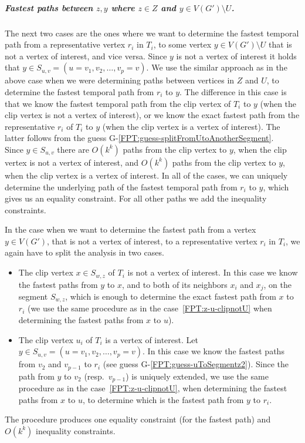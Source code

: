\documentclass[a4paper,UKenglish,cleveref, autoref, thm-restate]{lipics-v2021}
\begin{document}
\subparagraph{\boldmath Fastest paths between $z,y$ where $z \in Z$ and $y \in V(G') \setminus U$.}
The next two cases are the ones where we want to determine the fastest temporal path from a representative vertex $r_i$ in $T_i$, to some vertex $y \in V(G') \setminus U$ that is not a vertex of interest,
and vice versa.
Since $y$ is not a vertex of interest it holds that $y \in S_{u,v}=(u = v_1, v_2, \dots, v_p = v)$. %
We use the similar approach as in the above case when we were determining paths between vertices in $Z$ and $U$, 
to determine the fastest temporal path from $r_i$ to $y$. 
The difference in this case is that 
we know the fastest temporal path from the clip vertex of $T_i$ to $y$
(when the clip vertex is not a vertex of interest),
or we know the exact fastest path from the representative $r_i$ of $T_i$ to $y$
(when the clip vertex is a vertex of interest).
The latter follows from the guess G-\ref{FPT:guess-splitFromUtoAnotherSegment}.\\
%
Since $y \in S_{u,v}$ there are $O(k^{k})$ paths from the clip vertex to $y$, when the clip vertex is not a vertex of interest,
and $O(k^{k})$ paths from the clip vertex to $y$, when the clip vertex is a vertex of interest.
In all of the cases, we can uniquely determine the underlying path of the fastest temporal path from $r_i$ to $y$, which gives us an equality constraint.
For all other paths we add the inequality constraints. 

In the case when we want to determine the fastest path from a vertex $y \in V(G')$, that is not a vertex of interest,
to a representative vertex $r_i$ in $T_i$, 
we 
again have to split the analysis in two cases. 
\begin{itemize}
    \item The clip vertex $x \in S_{w,z}$ of $T_i$ is not a vertex of interest.
In this case we
know the fastest paths from $y$ to $x$, and to both of its neighbors $x_{i}$ and $x_{j}$, on the segment $S_{w,z}$,
which is enough to determine the exact fastest path from $x$ to $r_i$ 
(we use the same procedure as in the case~\ref{FPT:z-u-clipnotU} when determining the fastest paths from $x$ to $u$). 
    \item The clip vertex $u_i$ of $T_i$ is a vertex of interest.
Let $y \in S_{u,v} = (u = v_1,v_2, \dots, v_p = v)$.
In this case we know the fastest paths from $v_2$ and $v_{p-1}$ to $r_i$ (see guess G-\ref{FPT:guess-uToSegmentz2}).
Since the path from $y$ to $v_2$ (resp.~$v_{p-1}$) is uniquely extended, 
we use the same procedure as in the 
case~\ref{FPT:z-u-clipnotU}, when determining the fastest paths from $x$ to $u$,
to determine which is the fastest path from $y$ to $r_i$.
\end{itemize}
The procedure produces one equality constraint (for the fastest path) and $O(k^k)$ inequality constraints.
\end{document}

